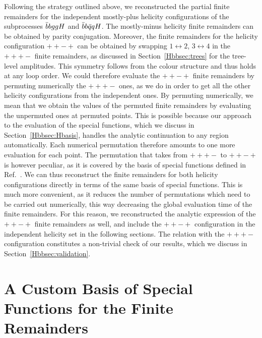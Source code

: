\documentclass[main.tex]{subfiles}
\begin{document}
Following the strategy outlined above, we reconstructed the partial finite remainders for the independent mostly-plus helicity configurations of the subprocesses $\bar{b}bggH$ and $\bar{b}b\bar{q}qH$. The mostly-minus helicity finite remainders can be obtained by parity conjugation. Moreover, the finite remainders for the helicity configuration $++-+$ can be obtained by swapping $1\leftrightarrow2$, $3\leftrightarrow 4$ in the $+++-$ finite remainders, as discussed in Section~\ref{Hbbsec:trees} for the tree-level amplitudes. 
This symmetry follows from the colour structure and thus holds at any loop order. 
We could therefore evaluate the $++-+$ finite remainders by permuting numerically the $+++-$ ones, as we do in order to get all the other helicity configurations from the independent ones. By permuting numerically, we mean that we obtain the values of the permuted finite remainders by evaluating the unpermuted ones at permuted points. This is possible because our approach to the evaluation of the special functions, which we discuss in Section~\ref{Hbbsec:Hbasis}, handles the analytic continuation to any region automatically. Each numerical permutation therefore amounts to one more evaluation for each point. The permutation that takes from $+++-$ to $++-+$ is however peculiar, as it is covered by the basis of special functions defined in Ref.~\cite{Badger:2021nhg}. We can thus reconstruct the finite remainders for both helicity configurations directly in terms of the same basis of special functions. This is much more convenient, as it reduces the number of permutations which need to be carried out numerically, this way decreasing the global evaluation time of the finite remainders. For this reason, we reconstructed the analytic expression of the $++-+$ finite remainders as well, and include the $++-+$ configuration in the independent helicity set in the following sections. 
The relation with the $+++-$ configuration constitutes a non-trivial check of our results, which we discuss in Section~\ref{Hbbsec:validation}.


\section[A Custom Basis for the Finite Remainders]{A Custom Basis of Special Functions for the Finite Remainders}
\end{document}
